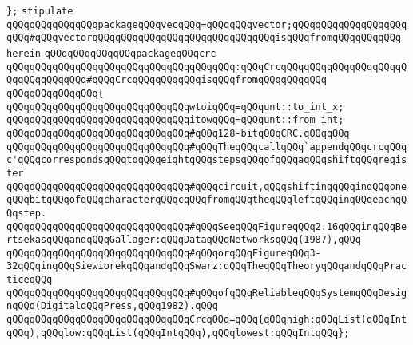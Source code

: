 \newline
\newline
\newline
\verb|};|\newline
\newline
\verb|stipulate|\newline
\verb|qQQqqQQqqQQqqQQqpackageqQQqvecqQQq=qQQqqQQqvector;qQQqqQQqqQQqqQQqqQQqqQQq#qQQqvectorqQQqqQQqqQQqqQQqqQQqqQQqqQQqqQQqisqQQqfromqQQqqQQqqQQq|\newline
\verb|herein|\newline
\newline
\verb|qQQqqQQqqQQqqQQqpackageqQQqcrc|\newline
\verb|qQQqqQQqqQQqqQQqqQQqqQQqqQQqqQQqqQQqqQQq:qQQqCrcqQQqqQQqqQQqqQQqqQQqqQQqqQQqqQQqqQQq#qQQqCrcqQQqqQQqqQQqisqQQqfromqQQqqQQqqQQq|\newline
\verb|qQQqqQQqqQQqqQQq{|\newline
\verb|qQQqqQQqqQQqqQQqqQQqqQQqqQQqqQQqwtoiqQQq=qQQqunt::to_int_x;|\newline
\verb|qQQqqQQqqQQqqQQqqQQqqQQqqQQqqQQqitowqQQq=qQQqunt::from_int;|\newline
\newline
\verb|qQQqqQQqqQQqqQQqqQQqqQQqqQQqqQQq#qQQq128-bitqQQqCRC.qQQqqQQq|\newline
\verb|qQQqqQQqqQQqqQQqqQQqqQQqqQQqqQQq#qQQqTheqQQqcallqQQq`appendqQQqcrcqQQqc'qQQqcorrespondsqQQqtoqQQqeightqQQqstepsqQQqofqQQqaqQQqshiftqQQqregister|\newline
\verb|qQQqqQQqqQQqqQQqqQQqqQQqqQQqqQQq#qQQqcircuit,qQQqshiftingqQQqinqQQqoneqQQqbitqQQqofqQQqcharacterqQQqcqQQqfromqQQqtheqQQqleftqQQqinqQQqeachqQQqstep.|\newline
\verb|qQQqqQQqqQQqqQQqqQQqqQQqqQQqqQQq#qQQqSeeqQQqFigureqQQq2.16qQQqinqQQqBertsekasqQQqandqQQqGallager:qQQqDataqQQqNetworksqQQq(1987),qQQq|\newline
\verb|qQQqqQQqqQQqqQQqqQQqqQQqqQQqqQQq#qQQqorqQQqFigureqQQq3-32qQQqinqQQqSiewiorekqQQqandqQQqSwarz:qQQqTheqQQqTheoryqQQqandqQQqPracticeqQQq|\newline
\verb|qQQqqQQqqQQqqQQqqQQqqQQqqQQqqQQq#qQQqofqQQqReliableqQQqSystemqQQqDesignqQQq(DigitalqQQqPress,qQQq1982).qQQq|\newline
\newline
\newline
\verb|qQQqqQQqqQQqqQQqqQQqqQQqqQQqqQQqCrcqQQq=qQQq{qQQqhigh:qQQqList(qQQqIntqQQq),qQQqlow:qQQqList(qQQqIntqQQq),qQQqlowest:qQQqIntqQQq};|\newline
